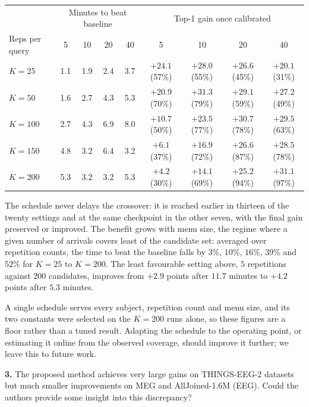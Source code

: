 \documentclass[11pt]{article}
\begin{document}
{\begin{center}
\small\setlength{\tabcolsep}{4pt}
\begin{tabular}{lcccc|cccc}
\hline
& \multicolumn{4}{c|}{Minutes to beat baseline} & \multicolumn{4}{c}{Top-1 gain once calibrated} \\
Reps per query & 5 & 10 & 20 & 40 & 5 & 10 & 20 & 40 \\
\hline
$K=25$  & 1.1 & 1.9 & 2.4 & 3.7 & $+24.1$ (57\%) & $+28.0$ (55\%) & $+26.6$ (45\%) & $+20.1$ (31\%) \\
$K=50$  & 1.6 & 2.7 & 4.3 & 5.3 & $+20.9$ (70\%) & $+31.3$ (79\%) & $+29.1$ (59\%) & $+27.2$ (49\%) \\
$K=100$ & 2.7 & 4.3 & 6.9 & 8.0 & $+10.7$ (50\%) & $+23.5$ (77\%) & $+30.7$ (78\%) & $+29.5$ (63\%) \\
$K=150$ & 4.8 & 3.2 & 6.4 & 3.2 & $+6.1$ (37\%)  & $+16.9$ (72\%) & $+26.6$ (87\%) & $+28.5$ (78\%) \\
$K=200$ & 5.3 & 3.2 & 3.2 & 5.3 & $+4.2$ (30\%)  & $+14.1$ (69\%) & $+25.2$ (94\%) & $+31.1$ (97\%) \\
\hline
\end{tabular}
\end{center}

The schedule never delays the crossover: it is reached earlier in thirteen of the twenty settings and at the same checkpoint in the other seven, with the final gain preserved or improved. The benefit grows with menu size, the regime where a given number of arrivals covers least of the candidate set: averaged over repetition counts, the time to beat the baseline falls by $3\%$, $10\%$, $16\%$, $39\%$ and $52\%$ for $K=25$ to $K=200$. The least favourable setting above, $5$ repetitions against $200$ candidates, improves from $+2.9$ points after $11.7$ minutes to $+4.2$ points after $5.3$ minutes.

A single schedule serves every subject, repetition count and menu size, and its two constants were selected on the $K=200$ runs alone, so these figures are a floor rather than a tuned result. Adapting the schedule to the operating point, or estimating it online from the observed coverage, should improve it further; we leave this to future work.
}

\textbf{3.} The proposed method achieves very large gains on THINGS-EEG-2 datasets but much smaller
improvements on MEG and AllJoined-1.6M (EEG). Could the authors provide some insight into this
discrepancy?
\end{document}
